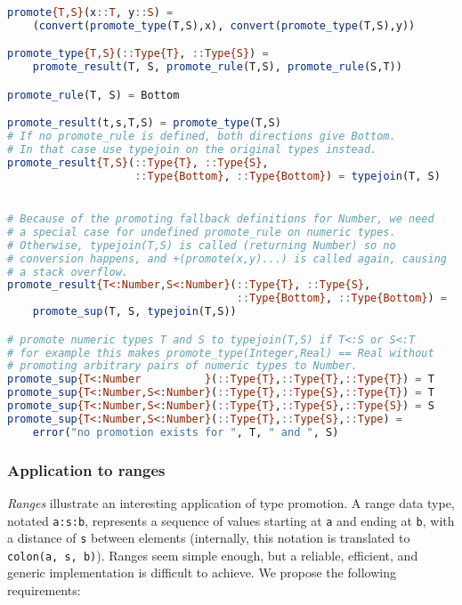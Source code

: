 \begin{singlespace}
\begin{lstlisting}[language=julia]
promote{T,S}(x::T, y::S) =
    (convert(promote_type(T,S),x), convert(promote_type(T,S),y))

promote_type{T,S}(::Type{T}, ::Type{S}) =
    promote_result(T, S, promote_rule(T,S), promote_rule(S,T))

promote_rule(T, S) = Bottom

promote_result(t,s,T,S) = promote_type(T,S)
# If no promote_rule is defined, both directions give Bottom.
# In that case use typejoin on the original types instead.
promote_result{T,S}(::Type{T}, ::Type{S},
                    ::Type{Bottom}, ::Type{Bottom}) = typejoin(T, S)


# Because of the promoting fallback definitions for Number, we need
# a special case for undefined promote_rule on numeric types.
# Otherwise, typejoin(T,S) is called (returning Number) so no
# conversion happens, and +(promote(x,y)...) is called again, causing
# a stack overflow.
promote_result{T<:Number,S<:Number}(::Type{T}, ::Type{S},
                                    ::Type{Bottom}, ::Type{Bottom}) =
    promote_sup(T, S, typejoin(T,S))

# promote numeric types T and S to typejoin(T,S) if T<:S or S<:T
# for example this makes promote_type(Integer,Real) == Real without
# promoting arbitrary pairs of numeric types to Number.
promote_sup{T<:Number          }(::Type{T},::Type{T},::Type{T}) = T
promote_sup{T<:Number,S<:Number}(::Type{T},::Type{S},::Type{T}) = T
promote_sup{T<:Number,S<:Number}(::Type{T},::Type{S},::Type{S}) = S
promote_sup{T<:Number,S<:Number}(::Type{T},::Type{S},::Type) =
    error("no promotion exists for ", T, " and ", S)
\end{lstlisting}
\end{singlespace}


\subsubsection{Application to ranges}

\emph{Ranges} illustrate an interesting application of type promotion.
A range data type, notated \texttt{a:s:b}, represents a sequence of values
starting at \texttt{a} and ending at \texttt{b}, with a distance of \texttt{s}
between elements (internally, this notation is translated to
\texttt{colon(a, s, b)}).
Ranges seem simple enough, but a reliable, efficient, and generic implementation
is difficult to achieve.
We propose the following requirements:

